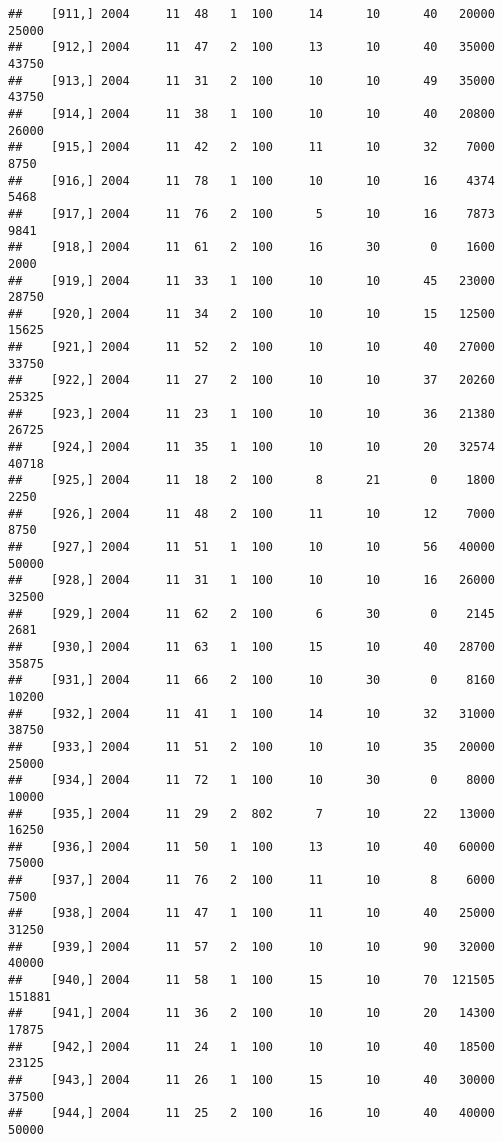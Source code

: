\documentclass{article}\usepackage[]{graphicx}\usepackage[]{color}
\makeatletter
\newenvironment{kframe}{%
 \def\at@end@of@kframe{}%
 \ifinner\ifhmode%
  \def\at@end@of@kframe{\end{minipage}}%
  \begin{minipage}{\columnwidth}%
 \fi\fi%
 \def\FrameCommand##1{\hskip\@totalleftmargin \hskip-\fboxsep
 \colorbox{shadecolor}{##1}\hskip-\fboxsep
     \hskip-\linewidth \hskip-\@totalleftmargin \hskip\columnwidth}%
 \MakeFramed {\advance\hsize-\width
   \@totalleftmargin\z@ \linewidth\hsize
   \@setminipage}}%
 {\par\unskip\endMakeFramed%
 \at@end@of@kframe}
\newenvironment{knitrout}{}{} %
\makeatother
\begin{document}
\begin{knitrout}
\begin{kframe}
\begin{verbatim}
##    [911,] 2004     11  48   1  100     14      10      40   20000   25000
##    [912,] 2004     11  47   2  100     13      10      40   35000   43750
##    [913,] 2004     11  31   2  100     10      10      49   35000   43750
##    [914,] 2004     11  38   1  100     10      10      40   20800   26000
##    [915,] 2004     11  42   2  100     11      10      32    7000    8750
##    [916,] 2004     11  78   1  100     10      10      16    4374    5468
##    [917,] 2004     11  76   2  100      5      10      16    7873    9841
##    [918,] 2004     11  61   2  100     16      30       0    1600    2000
##    [919,] 2004     11  33   1  100     10      10      45   23000   28750
##    [920,] 2004     11  34   2  100     10      10      15   12500   15625
##    [921,] 2004     11  52   2  100     10      10      40   27000   33750
##    [922,] 2004     11  27   2  100     10      10      37   20260   25325
##    [923,] 2004     11  23   1  100     10      10      36   21380   26725
##    [924,] 2004     11  35   1  100     10      10      20   32574   40718
##    [925,] 2004     11  18   2  100      8      21       0    1800    2250
##    [926,] 2004     11  48   2  100     11      10      12    7000    8750
##    [927,] 2004     11  51   1  100     10      10      56   40000   50000
##    [928,] 2004     11  31   1  100     10      10      16   26000   32500
##    [929,] 2004     11  62   2  100      6      30       0    2145    2681
##    [930,] 2004     11  63   1  100     15      10      40   28700   35875
##    [931,] 2004     11  66   2  100     10      30       0    8160   10200
##    [932,] 2004     11  41   1  100     14      10      32   31000   38750
##    [933,] 2004     11  51   2  100     10      10      35   20000   25000
##    [934,] 2004     11  72   1  100     10      30       0    8000   10000
##    [935,] 2004     11  29   2  802      7      10      22   13000   16250
##    [936,] 2004     11  50   1  100     13      10      40   60000   75000
##    [937,] 2004     11  76   2  100     11      10       8    6000    7500
##    [938,] 2004     11  47   1  100     11      10      40   25000   31250
##    [939,] 2004     11  57   2  100     10      10      90   32000   40000
##    [940,] 2004     11  58   1  100     15      10      70  121505  151881
##    [941,] 2004     11  36   2  100     10      10      20   14300   17875
##    [942,] 2004     11  24   1  100     10      10      40   18500   23125
##    [943,] 2004     11  26   1  100     15      10      40   30000   37500
##    [944,] 2004     11  25   2  100     16      10      40   40000   50000

\end{verbatim}
\end{kframe}
\end{knitrout}
\end{document}
